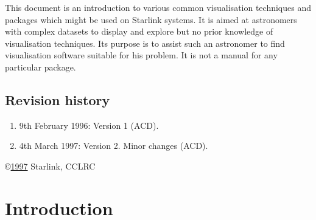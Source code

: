
This document is an introduction to various common visualisation 
techniques and packages which might be used on Starlink systems. It is
aimed at astronomers with complex datasets to display and explore but
no prior knowledge of visualisation techniques. Its purpose is to
assist such an astronomer to find visualisation software suitable for his
problem. It is not a manual for any particular package.
 \begin{latexonly}
   \newpage
   \setlength{\parskip}{0mm}
   \latexonlytoc

   \newpage
   \listoftables
   \listoffigures

   \setlength{\parskip}{\medskipamount}
   \markboth{\stardocname}{\stardocname}
 \end{latexonly}

\newpage
\subsection*{Revision history}

\begin{enumerate}

  \item 9th February 1996: Version 1 (ACD).

  \item 4th March 1997: Version 2.  Minor changes (ACD).

\end{enumerate}

\vspace{5cm}
\copyright \underline{1997} Starlink, CCLRC


\cleardoublepage
\renewcommand{\thepage}{\arabic{page}}
\setcounter{page}{1}



\section{Introduction  }

